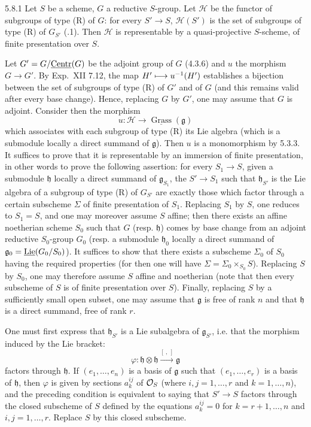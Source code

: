 \begin{theorem}{5.8.1}\label{XXII.5.8.1}
Let $S$ be a scheme, $G$ a reductive $S$-group. Let $\mathscr H$ be the functor of subgroups of type (R) of $G$: for every $S'\to S$, $\mathscr H(S')$ is the set of subgroups of type (R) of $G_{S'}$ (.1). Then $\mathscr H$ is representable by a quasi-projective $S$-scheme, of finite presentation over $S$.
\end{theorem}
{\renewcommand{\thefootnote}{(49)}}%
Let $G'=G/\underline{\mathrm{Centr}}(G)$ be the adjoint group of $G$ (4.3.6) and $u$ the morphism $G\to G'$. By Exp.~XII 7.12, the map $H'\longmapsto u^{-1}(H')$ establishes a bijection between the set of subgroups of type (R) of $G'$ and of $G$ (and this remains valid after every base change). Hence, replacing $G$ by $G'$, one may assume that $G$ is adjoint. Consider then the morphism
\[
u:\mathscr H\to\underline{\operatorname{Grass}}(\mathfrak g)
\]
which associates with each subgroup of type (R) its Lie algebra (which is a submodule locally a direct summand of $\mathfrak g${\renewcommand{\thefootnote}{(50)}}). Then $u$ is a monomorphism by 5.3.3. It suffices to prove that it is representable by an immersion of finite presentation, in other words to prove the following assertion: for every $S_1\to S$, given a submodule $\mathfrak h$ locally a direct summand of $\mathfrak g_{S_1}$, the $S'\to S_1$ such that $\mathfrak h_{S'}$ is the Lie algebra of a subgroup of type (R) of $G_{S'}$ are exactly those which factor through a certain subscheme $\Sigma$ of finite presentation of $S_1$. Replacing $S_1$ by $S$, one reduces to $S_1=S$, and one may moreover assume $S$ affine; then there exists an affine noetherian scheme $S_0$ such that $G$ (resp. $\mathfrak h$) comes by base change from an adjoint reductive $S_0$-group $G_0$ (resp. a submodule $\mathfrak h_0$ locally a direct summand of $\mathfrak g_0=\underline{\operatorname{Lie}}(G_0/S_0)$). It suffices to show that there exists a subscheme $\Sigma_0$ of $S_0$ having the required properties (for then one will have $\Sigma=\Sigma_0\times_{S_0}S$). Replacing $S$ by $S_0$, one may therefore assume $S$ affine and noetherian (note that then every subscheme of $S$ is of finite presentation over $S$). Finally, replacing $S$ by a sufficiently small open subset, one may assume that $\mathfrak g$ is free of rank $n$ and that $\mathfrak h$ is a direct summand, free of rank $r$.

One must first express that $\mathfrak h_{S'}$ is a Lie subalgebra of $\mathfrak g_{S'}$, i.e. that the morphism induced by the Lie bracket:
\[
\varphi:\mathfrak h\otimes\mathfrak h\xrightarrow{[\ ,\ ]}\mathfrak g
\]
factors through $\mathfrak h$. If $(e_1,\ldots,e_n)$ is a basis of $\mathfrak g$ such that $(e_1,\ldots,e_r)$ is a basis of $\mathfrak h$, then $\varphi$ is given by sections $a_k^{ij}$ of $\mathcal{O}_S$ (where $i,j=1,\ldots,r$ and $k=1,\ldots,n$), and the preceding condition is equivalent to saying that $S'\to S$ factors through the closed subscheme of $S$ defined by the equations $a_k^{ij}=0$ for $k=r+1,\ldots,n$ and $i,j=1,\ldots,r$. Replace $S$ by this closed subscheme.

